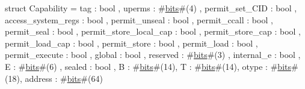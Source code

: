 struct Capability = {
  tag                    : bool    ,
  uperms                 : #\hyperref[sailMIPSzbits]{bits}#(4) ,
  permit_set_CID         : bool    ,
  access_system_regs     : bool    ,
  permit_unseal          : bool    ,
  permit_ccall           : bool    ,
  permit_seal            : bool    ,
  permit_store_local_cap : bool    ,
  permit_store_cap       : bool    ,
  permit_load_cap        : bool    ,
  permit_store           : bool    ,
  permit_load            : bool    ,
  permit_execute         : bool    ,
  global                 : bool    ,
  reserved               : #\hyperref[sailMIPSzbits]{bits}#(3) ,
  internal_e             : bool    ,
  E                      : #\hyperref[sailMIPSzbits]{bits}#(6) ,
  sealed                 : bool    ,
  B                      : #\hyperref[sailMIPSzbits]{bits}#(14),
  T                      : #\hyperref[sailMIPSzbits]{bits}#(14),
  otype                  : #\hyperref[sailMIPSzbits]{bits}#(18),
  address                : #\hyperref[sailMIPSzbits]{bits}#(64)
}

